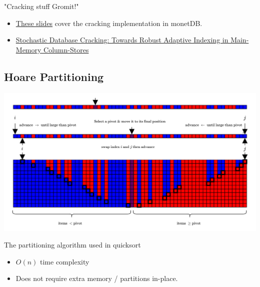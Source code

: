 \begin{sidenotebox}{"Cracking stuff Gromit!"}
    \begin{itemize}
        \item \href{https://homepages.cwi.nl/~mk/onderwijs/adt2009/lectures/lecture5.pdf}{These slides} cover the cracking implementation in monetDB.
        \item \href{https://stratos.seas.harvard.edu/sites/scholar.harvard.edu/files/StochasticDatabaseCrackingPVLDB12.pdf}{Stochastic Database Cracking: Towards Robust Adaptive
                  Indexing in Main-Memory Column-Stores}
    \end{itemize}
\end{sidenotebox}

\subsection{Hoare Partitioning}
\begin{center}
    \includegraphics[width=\textwidth]{advanced_topics/images/hoare_partitioning.drawio.png}
\end{center}
The partitioning algorithm used in quicksort
\begin{itemize}
    \item $O(n)$ time complexity
    \item Does not require extra memory / partitions in-place.
\end{itemize}

